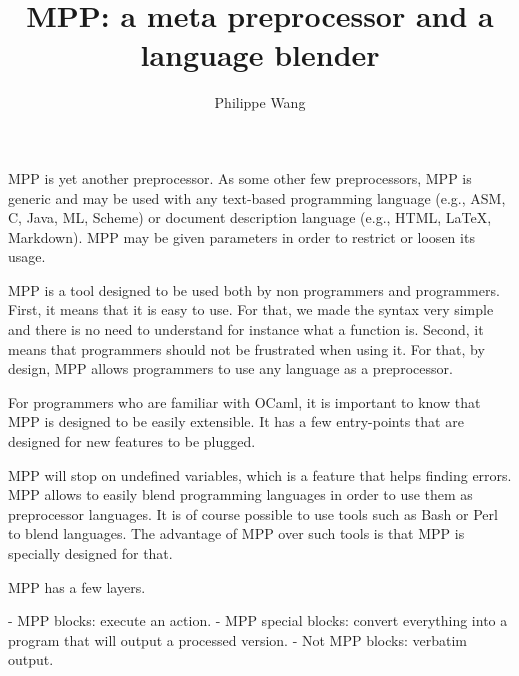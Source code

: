 \documentclass{article}
\title{MPP: a meta preprocessor and a language blender}
\author{Philippe Wang}
\begin{document}
\maketitle
MPP is yet another preprocessor.  As some other few preprocessors, MPP
is generic  and may be  used with any text-based  programming language
(e.g.,  ASM, C,  Java, ML,  Scheme) or  document  description language
(e.g., HTML, LaTeX, Markdown). MPP may be given parameters in order to
restrict or loosen its usage.

MPP  is  a tool  designed  to  be used  both  by  non programmers  and
programmers. First, it means that it is easy to use. For that, we made
the syntax very simple and there is no need to understand for instance
what a  function is. Second, it  means that programmers  should not be
frustrated when using it. For  that, by design, MPP allows programmers
to use any language as a preprocessor.

For programmers who  are familiar with OCaml, it  is important to know
that  MPP  is  designed  to   be  easily  extensible.  It  has  a  few
entry-points that are designed for new features to be plugged.

MPP will  stop on undefined variables,  which is a  feature that helps
finding errors.   MPP allows to easily blend  programming languages in
order to use them as  preprocessor languages. It is of course possible
to use tools  such as Bash or Perl to  blend languages.  The advantage
of MPP over such tools is that MPP is specially designed for that.

MPP has a few layers.

- MPP blocks: execute an action.
- MPP special blocks: convert everything into a program that will output a processed version.
- Not MPP blocks: verbatim output.
\end{document}
